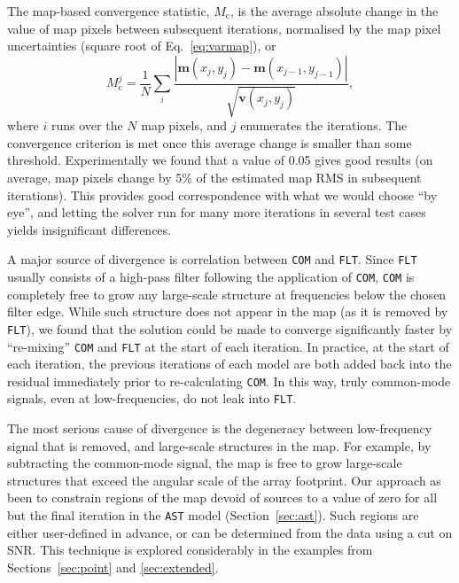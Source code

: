 \documentclass[useAMS,usenatbib,nofootinbib]{mn2e}
\newcommand{\snr}{SNR}
\newcommand{\model}[1]{\texttt{#1}}
\begin{document}
The map-based convergence statistic, $M_\mathrm{c}$, is the average
absolute change in the value of map pixels between subsequent
iterations, normalised by the map pixel uncertainties (square root of
Eq.~\ref{eq:varmap}), or
%
\begin{equation}
M^j_\mathrm{c} = \frac{1}{N} \sum_i \frac{| \mathbf{m}(x_j,y_j) -
  \mathbf{m}(x_{j-1},y_{j-1}) |} {\sqrt{\mathbf{v}(x_j,y_j)}} ,
\end{equation}
%
where $i$ runs over the $N$ map pixels, and $j$ enumerates the
iterations. The convergence criterion is met once this average change
is smaller than some threshold. Experimentally we found that a value
of 0.05 gives good results (on average, map pixels change by 5\% of
the estimated map RMS in subsequent iterations).  This provides good
correspondence with what we would choose ``by eye'', and letting the
solver run for many more iterations in several test cases yields
insignificant differences.

A major source of divergence is correlation between \model{COM} and
\model{FLT}. Since \model{FLT} usually consists of a high-pass filter
following the application of \model{COM}, \model{COM} is completely
free to grow any large-scale structure at frequencies below the chosen
filter edge. While such structure does not appear in the map (as it is
removed by \model{FLT}), we found that the solution could be made to
converge significantly faster by ``re-mixing'' \model{COM} and
\model{FLT} at the start of each iteration. In practice, at the start
of each iteration, the previous iterations of each model are both
added back into the residual immediately prior to re-calculating
\model{COM}. In this way, truly common-mode signals, even at
low-frequencies, do not leak into \model{FLT}.

The most serious cause of divergence is the degeneracy between
low-frequency signal that is removed, and large-scale structures in
the map. For example, by subtracting the common-mode signal, the map
is free to grow large-scale structures that exceed the angular scale
of the array footprint. Our approach as been to constrain regions of
the map devoid of sources to a value of zero for all but the final
iteration in the \model{AST} model (Section~\ref{sec:ast}). Such
regions are either user-defined in advance, or can be determined from
the data using a cut on \snr. This technique is explored considerably
in the examples from Sections~\ref{sec:point} and \ref{sec:extended}.

\end{document}
